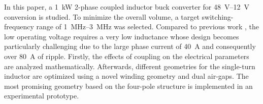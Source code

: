 \documentclass{IPEC2026}
\begin{document}
In this paper, a \qty{1}{\kW} 2-phase coupled inductor buck converter for \qtyrange{48}{12}{\V} conversion is studied. To minimize the overall volume, a target switching-frequency range of \qtyrange{1}{3}{\MHz} was selected. Compared to previous work \cite{nan1MHzBidirectional2016, dongInvestigationMultiphaseCoupledInductor2009, shaZVSInterleavedSynchronousBuck2022, huaUltrathinCoupledInductor2021, wangPCBWindingBasedCoupled2023}, the low operating voltage requires a very low inductance whose design becomes particularly challenging due to the large phase current of \qty{40}{\A} and consequently over \qty{80}{\A} of ripple. Firstly, the effects of coupling on the electrical parameters are analyzed mathematically. Afterwards, different geometries for the single-turn inductor are optimized using a novel winding geometry and dual air-gaps. The most promising geometry based on the four-pole structure is implemented in an experimental prototype. %



\end{document}
